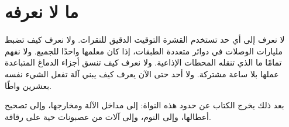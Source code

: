 \section*{ما لا نعرفه}

لا نعرف إلى أي حد تستخدم القشرة التوقيت الدقيق للنقرات. ولا نعرف كيف تضبط مليارات الوصلات في دوائر متعددة الطبقات، إذا كان معلمها واحدًا للجميع. ولا نفهم تمامًا ما الذي تنقله المحطات الإذاعية. ولا نعرف كيف تنسق أجزاء الدماغ المتباعدة عملها بلا ساعة مشتركة. ولا أحد حتى الآن يعرف كيف يبني آلة تفعل الشيء نفسه بعشرين واطًا.

بعد ذلك يخرج الكتاب عن حدود هذه النواة: إلى مداخل الآلة ومخارجها، وإلى تصحيح أعطالها، وإلى النوم، وإلى آلات من عصبونات حية على رقاقة.

